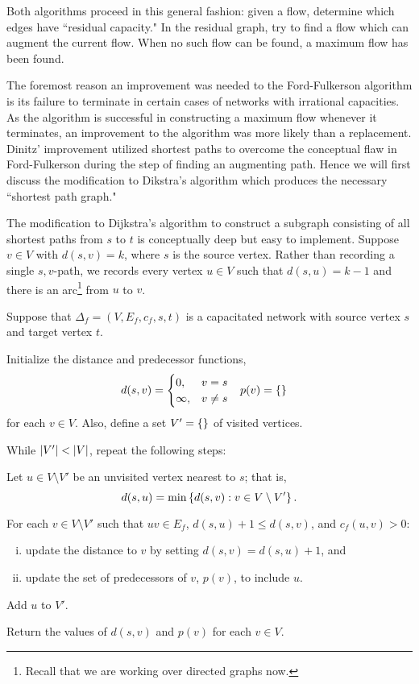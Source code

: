\documentclass[m3380-lec-main.tex]{subfiles}
\begin{document}
Both algorithms proceed in this general fashion: given a flow, determine which edges have ``residual capacity." In the residual graph, try to find a flow which can augment the current flow. When no such flow can be found, a maximum flow has been found.

The foremost reason an improvement was needed to the Ford-Fulkerson algorithm is its failure to terminate in certain cases of networks with irrational capacities. As the algorithm is successful in constructing a maximum flow whenever it terminates, an improvement to the algorithm was more likely than a replacement. Dinitz' improvement utilized shortest paths to overcome the conceptual flaw in Ford-Fulkerson during the step of finding an augmenting path. Hence we will first discuss the modification to Dikstra's algorithm which produces the necessary ``shortest path graph." 

The modification to Dijkstra's algorithm to construct a subgraph consisting of all shortest paths from $s$ to $t$ is conceptually deep but easy to implement. Suppose $v\in V$ with $d(s,v)=k$, where $s$ is the source vertex. Rather than recording a single $s,v$-path, we records every vertex $u\in V$ such that $d(s,u)=k-1$ and there is an arc\footnote{Recall that we are working over directed graphs now.} from $u$ to $v$.

\begin{alg}\label{alg:mod_dijkstra} Suppose that $\Delta_f=(V,E_f,c_f,s,t)$ is a capacitated network with source vertex $s$ and target vertex $t$.
\begin{enum}
\item Initialize the distance and predecessor functions,
\begin{align*}
d(s,v) &= \begin{cases} 0, & v=s \\ \infty, &v\neq s \end{cases} 
&
p(v) &= \left\{\right\}
\end{align*}
for each $v\in V$. Also, define a set $V'=\left\{\right\}$ of visited vertices.
\item While $\left|V'\right|<\left|V\right|$, repeat the following steps:
\begin{enuma}
\item Let $u\in V\setminus V'$ be an unvisited vertex nearest to $s$; that is, \[d(s,u)=\min\left\{d(s,v):v\in V\setminus V'\right\}.\]
\item For each $v\in V\setminus V'$ such that $uv\in E_f$, $d(s,u)+1\leq d(s,v)$, and $c_f(u,v)>0$:
\begin{enumerate}[i.~]
\item update the distance to $v$ by setting $d(s,v)=d(s,u)+1$, and
\item update the set of predecessors of $v$, $p(v)$, to include $u$.
\end{enumerate} 
\item Add $u$ to $V'$.
\end{enuma}
\item Return the values of $d(s,v)$ and $p(v)$ for each $v\in V$.
\end{enum}
\end{alg}
\end{document}
